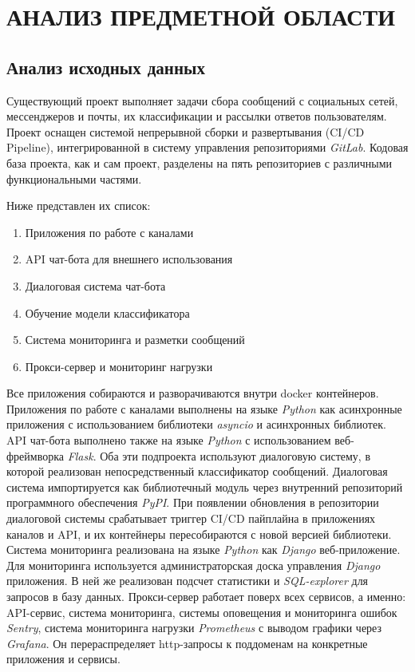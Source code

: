 \section{АНАЛИЗ ПРЕДМЕТНОЙ ОБЛАСТИ}
    \subsection{Анализ исходных данных}
    Существующий проект выполняет задачи сбора сообщений с социальных сетей, мессенджеров и почты,
    их классификации и рассылки ответов пользователям.
    Проект оснащен системой непрерывной сборки и развертывания (CI/CD Pipeline), интегрированной в
    систему управления репозиториями \textit{GitLab}\cite{docs.gitlab}.
    Кодовая база проекта, как и сам проект, разделены на пять репозиториев с различными
    функциональными частями.
    
    Ниже представлен их список:
    \begin{enumerate}
        \item Приложения по работе с каналами
        \item API чат-бота для внешнего использования
        \item Диалоговая система чат-бота
        \item Обучение модели классификатора
        \item Система мониторинга и разметки сообщений
        \item Прокси-сервер и мониторинг нагрузки
    \end{enumerate}
    
    Все приложения собираются и разворачиваются внутри docker контейнеров.
    Приложения по работе с каналами выполнены на языке \textit{Python} как асинхронные приложения
    с использованием библиотеки \textit{asyncio} и асинхронных библиотек.
    API чат-бота выполнено также на языке \textit{Python} с использованием веб-фреймворка \textit{Flask}.
    Оба эти подпроекта используют диалоговую систему, в которой реализован непосредственный
    классификатор сообщений.
    Диалоговая система импортируется как библиотечный модуль через внутренний репозиторий
    программного обеспечения \textit{PyPI}.
    При появлении обновления в репозитории диалоговой системы срабатывает триггер CI/CD пайплайна
    в приложениях каналов и API, и их контейнеры пересобираются с новой версией библиотеки.
    Система мониторинга реализована на языке \textit{Python} как \textit{Django} веб-приложение.
    Для мониторинга используется администраторская доска управления \textit{Django} приложения.
    В ней же реализован подсчет статистики и \textit{SQL-explorer} для запросов в базу данных.
    Прокси-сервер работает поверх всех сервисов, а именно: API-сервис, система мониторинга,
    системы оповещения и мониторинга ошибок \textit{Sentry}\cite{docs.sentry}, система мониторинга
    нагрузки \textit{Prometheus} с выводом графики через \textit{Grafana}.
    Он перераспределяет http-запросы к поддоменам на конкретные приложения и сервисы.

